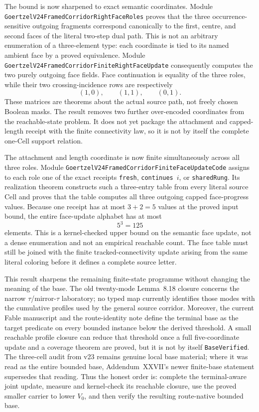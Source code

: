 \documentclass[11pt]{article}
\theoremstyle{definition}
\begin{document}
The bound is now sharpened to exact semantic coordinates.  Module
\texttt{GoertzelV24FramedCorridorRightFaceRoles} proves that the three
occurrence-sensitive outgoing fragments correspond canonically to the first,
centre, and second faces of the literal two-step dual path.  This is not an
arbitrary enumeration of a three-element type: each coordinate is tied to its
named ambient face by a proved equivalence.  Module
\texttt{GoertzelV24FramedCorridorFiniteRightFaceUpdate} consequently computes
the two purely outgoing face fields.  Face continuation is equality of the
three roles, while their two crossing-incidence rows are respectively
\[
 (1,0),\qquad (1,1),\qquad (0,1).
\]
These matrices are theorems about the actual source path, not freely chosen
Boolean masks.  The result removes two further over-encoded coordinates from
the reachable-state problem.  It does not yet package the attachment and
capped-length receipt with the finite connectivity law, so it is not by itself
the complete one-Cell support relation.

The attachment and length coordinate is now finite simultaneously across all
three roles.  Module
\texttt{GoertzelV24FramedCorridorFiniteFaceUpdateCode} assigns to each role one
of the exact receipts \texttt{fresh}, \texttt{continues}~$i$, or
\texttt{sharedRung}.  Its realization theorem constructs such a three-entry
table from every literal source Cell and proves that the table computes all
three outgoing capped face-progress values.  Because one receipt has at most
$3+2=5$ values at the proved input bound, the entire face-update alphabet has
at most
\[
 5^3=125
\]
elements.  This is a kernel-checked upper bound on the semantic face update,
not a dense enumeration and not an empirical reachable count.  The face table
must still be joined with the finite tracked-connectivity update arising from
the same literal coloring before it defines a complete source letter.

This result sharpens the remaining finite-state programme without changing
the meaning of the base.  The old twenty-mode Lemma~8.18 closure concerns the
narrow $\tau$/mirror-$\tau$ laboratory; no typed map currently identifies
those modes with the cumulative profiles used by the general source corridor.
Moreover, the current Fable manuscript and the route-identity note define the
terminal base as the target predicate on every bounded instance below the
derived threshold.  A small reachable profile closure can reduce that
threshold once a full five-coordinate update and a coverage theorem are
proved, but it is not by itself \texttt{BaseVerified}.  The three-cell audit
from v23 remains genuine local base material; where it was read as the entire
bounded base, Addendum~XXVII's newer finite-base statement supersedes that
reading.  Thus the honest order is: complete the terminal-aware joint update,
measure and kernel-check its reachable closure, use the proved smaller carrier
to lower $V_0$, and then verify the resulting route-native bounded base.
\end{document}
